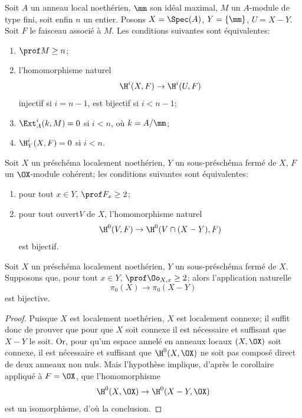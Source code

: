 \bgroup
\def\labelenumi{\theenumi)}
\begin{exemple} \label{III.3.4}
Soit $A$ un anneau local noeth\'erien, $\mm$ son id\'eal maximal, $M$ un $A$-module de type fini, soit enfin $n$ un entier. Posons $X=\Spec (A)$, $Y=\{\mm\}$, $U=X-Y$. Soit $F$ le faisceau associ\'e \`a $M$. Les conditions suivantes sont \'equivalentes:
\begin{enumerate}

\item
$\prof M \geq n$;

\item
l'homomorphisme naturel
\[
\H^i(X, F) \to \H^i(U, F)
\]
 injectif si $i=n-1$, est bijectif si $i<n-1$;

\item
$\Ext_A^i(k, M) =0$ si $i<n$, o\`u $k=A/\mm$;

\item
$\H_Y^i(X, F)=0$ si $i<n$.
\end{enumerate}
\end{exemple}



\begin{corollaire} \label{III.3.5}
Soit $X$ un pr\'esch\'ema localement noeth\'erien, $Y$ un sous-pr\'esch\'ema ferm\'e de $X$, $F$ un $\OX$-module coh\'erent; les conditions suivantes sont \'equivalentes:
\begin{enumerate}
\item
pour tout $x\in Y$, $\prof F_x \geq 2$;
\item
pour tout ouvert\pageoriginale $V$ de $X$, l'homomorphisme naturel
\[
\H^0(V, F) \to \H^0(V\cap(X-Y), F)
\]
est bijectif.
\end{enumerate}
\end{corollaire}
\egroup

\begin{theoreme}[HARTSHORNE] \label{III.3.6}
Soit $X$ un pr\'esch\'ema localement noeth\'erien, $Y$ un sous-pr\'esch\'ema ferm\'e de $X$. Supposons que, pour tout $x\in Y$, $\prof \Oo_{X, x} \geq 2$; alors l'application naturelle
\[
\pi_0(X) \to \pi_0(X-Y)
\]
est bijective.
\end{theoreme}

\begin{proof}
Puisque $X$ est localement noeth\'erien, $X$ est localement connexe; il suffit donc de prouver que pour que $X$ soit connexe il est n\'ecessaire et suffisant que $X-Y$ le soit. Or, pour qu'un espace annel\'e en anneaux  locaux $(X, \OX)$ soit connexe, il est n\'ecessaire et suffisant que $\H^0(X, \OX)$ ne soit pas compos\'e direct de deux anneaux non nuls. Mais l'hypoth\`ese implique, d'apr\`es le corollaire  appliqu\'e \`a $F=\OX$, que l'homomorphisme
\[
\H^0(X, \OX) \to \H^0(X-Y, \OX)
\]
est un isomorphisme, d'o\`u la conclusion.
\skipqed
\end{proof}


